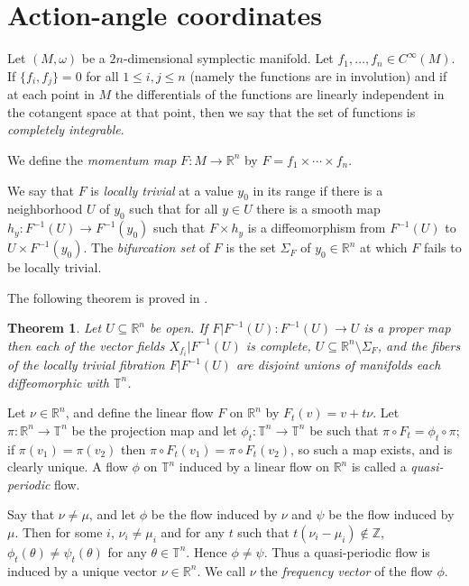 \documentclass{article}
\newtheorem{theorem}{Theorem}
\begin{document}
\section{Action-angle coordinates}
Let $(M,\omega)$ be a $2n$-dimensional symplectic manifold. Let $f_1,\ldots,f_n \in C^\infty(M)$. If $\{f_i,f_j\}=0$ for all
$1 \leq i,j \leq n$ (namely the functions are in involution) and if at each point in $M$
the differentials of the functions are linearly
independent in the cotangent space at that point, then we say that
the set of functions is {\em completely integrable}.

We define the {\em momentum map} $F:M \to \mathbb{R}^n$ by
$F=f_1 \times \cdots \times f_n$.

We say that $F$ is {\em locally trivial} at a value $y_0$ in its range if
there is a neighborhood $U$ of $y_0$ such that for all $y\in U$ there is a smooth map $h_y:F^{-1}(U) \to F^{-1}(y_0)$ such that $F \times h_y$ is a diffeomorphism from $F^{-1}(U)$ to $U \times F^{-1}(y_0)$. The
{\em bifurcation set} of $F$ is the set $\Sigma_F$ of $y_0 \in \mathbb{R}^n$ at which
$F$ fails to be locally trivial.

The following theorem is proved in \cite[Theorem 5.2.21]{foundations}.

\begin{theorem}
Let $U \subseteq \mathbb{R}^n$ be open. If $F|F^{-1}(U):F^{-1}(U) \to U$
is a proper map then each of the vector fields $X_{f_i}|F^{-1}(U)$ is complete, $U \subseteq \mathbb{R}^n \setminus \Sigma_F$, and the fibers
of the locally trivial fibration $F|F^{-1}(U)$ are disjoint unions
of manifolds each diffeomorphic with $\mathbb{T}^n$.
\end{theorem}  

Let $\nu \in \mathbb{R}^n$, and define the linear flow $F$ on $\mathbb{R}^n$
by
$F_t(v)=v+t\nu$. Let $\pi:\mathbb{R}^n \to \mathbb{T}^n$ be the projection
map and let $\phi_t:\mathbb{T}^n \to \mathbb{T}^n$ be such that
$\pi \circ F_t = \phi_t \circ \pi$; if $\pi(v_1)=\pi(v_2)$ then
$\pi \circ F_t(v_1)=\pi \circ F_t(v_2)$, so such a map exists,  and is clearly unique.
A flow $\phi$ on $\mathbb{T}^n$ induced by a linear flow on $\mathbb{R}^n$ is called a {\em quasi-periodic} flow.

Say that $\nu \neq \mu$, and let $\phi$ be the flow induced by $\nu$
and $\psi$ be the flow induced by $\mu$. Then for some $i$, $\nu_i \neq
\mu_i$ and for any $t$ such that $t(\nu_i-\mu_i) \not \in \mathbb{Z}$,
$\phi_t(\theta) \neq \psi_t(\theta)$ for any $\theta \in \mathbb{T}^n$. Hence
$\phi \neq \psi$. Thus  
a quasi-periodic flow is induced by
a unique vector $\nu \in \mathbb{R}^n$. We call $\nu$ the {\em frequency vector} of the flow $\phi$.
\end{document}
